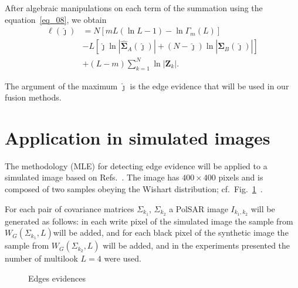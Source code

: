 \documentclass[conference]{IEEEtran}
\begin{document}
After algebraic manipulations on each term of the summation using the equation~\eqref{eq_08}, we obtain
\begin{align}\nonumber
	\ell(\widehat\jmath)&=N\left[mL(\ln{L}-1)-\ln{\Gamma_m(L)}\right]\\\nonumber
	&- L\left[\widehat\jmath\ln{|\mathbf{\widehat{\Sigma}}_{A}(\widehat\jmath)|} +(N-\widehat\jmath)\ln{|\mathbf{\widehat{\Sigma}}_{B}(\widehat\jmath)|}\right] \\
	&+ (L-m)\sum_{k=1}^{N}\ln{|\mathbf{Z}_{k}|}.\label{eq_09}
\end{align}

The argument of the maximum $\widehat{\jmath}$ is the edge evidence that will be used in our fusion methods.

\section{Application in simulated images}\label{sec_06}

The methodology (MLE) for detecting edge evidence will be applied to a simulated image based on Refs.~\cite{nhfc,gamf}. 
The image has $400\times400$ pixels and is composed of two samples obeying the Wishart distribution; cf.\ Fig.~\ref{fig_Edges-Evidence}~.

For each pair of covariance matrices $\Sigma_{k_1}$, $\Sigma_{k_2}$ a PolSAR image $I_{k_1,k_2}$ will be generated as follows: in each write pixel of the simulated image the sample from  $W_G(\Sigma_{k_1}, L)$will be added,  and for each black pixel of the synthetic image the sample from $W_G(\Sigma_{k_2},L)$ will be added, and in the experiments presented the number of multilook $L=4$ were used.

\begin{figure}[hbt]
    \caption{Edges evidences}
     \label{fig_Edges-Evidence}
\end{figure}
\end{document}
